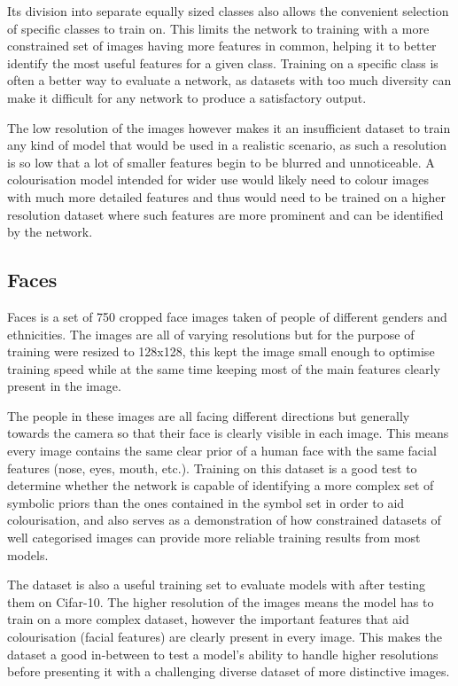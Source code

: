 \documentclass{l4proj}
\begin{document}
Its division into separate equally sized classes also allows the convenient selection of specific classes to train on. This limits the network to training with a more constrained set of images having more features in common, helping it to better identify the most useful features for a given class. Training on a specific class is often a better way to evaluate a network, as datasets with too much diversity can make it difficult for any network to produce a satisfactory output. 

The low resolution of the images however makes it an insufficient dataset to train any kind of model that would be used in a realistic scenario, as such a resolution is so low that a lot of smaller features begin to be blurred and unnoticeable. A colourisation model intended for wider use would likely need to colour images with much more detailed features and thus would need to be trained on a higher resolution dataset where such features are more prominent and can be identified by the network.

\subsection{Faces}
Faces is a set of 750 cropped face images taken of people of different genders and ethnicities. The images are all of varying resolutions but for the purpose of training were resized to 128x128, this kept the image small enough to optimise training speed while at the same time keeping most of the main features clearly present in the image.

The people in these images are all facing different directions but generally towards the camera so that their face is clearly visible in each image. This means every image contains the same clear prior of a human face with the same facial features (nose, eyes, mouth, etc.). Training on this dataset is a good test to determine whether the network is capable of identifying a more complex set of symbolic priors than the ones contained in the symbol set in order to aid colourisation, and also serves as a demonstration of how constrained datasets of well categorised images can provide more reliable training results from most models.

The dataset is also a useful training set to evaluate models with after testing them on Cifar-10. The higher resolution of the images means the model has to train on a more complex dataset, however the important features that aid colourisation (facial features) are clearly present in every image. This makes the dataset a good in-between to test a model's ability to handle higher resolutions before presenting it with a challenging diverse dataset of more distinctive images.
\end{document}
